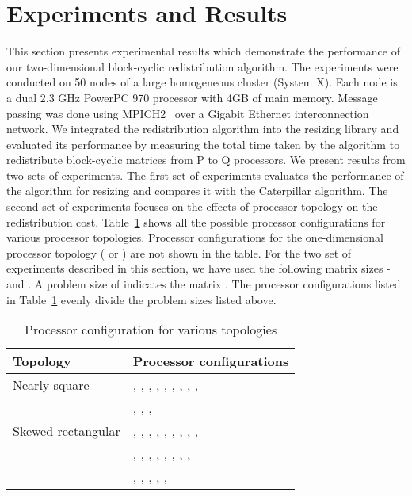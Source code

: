 \documentclass[letterpaper]{llncs}
\begin{document}
\section{Experiments and Results}
\label{sec:experiments}
This section presents experimental results which demonstrate the performance of our two-dimensional block-cyclic redistribution algorithm.
The experiments were conduct\-ed on 50 nodes of a large  homogeneous cluster (System X).  Each node is a dual 2.3 GHz PowerPC 970 processor with 4GB of main memory.
Message passing was done using MPICH2~\cite{mpich2} over a Gigabit Ethernet
interconnection network. We integrated the redistribution algorithm  into the resizing library and evaluated its performance by measuring the total time taken by the algorithm to redistribute block-cyclic matrices  from P to Q processors. 
We present results from two sets of experiments. The first set of experiments evaluates the performance of the algorithm for resizing and compares it with 
the Caterpillar algorithm.
The second set of experiments focuses on the effects of processor topology on the redistribution cost. Table~\ref{tab:procconfig} shows all 
the possible processor configurations for various processor topologies. Processor configurations for the one-dimensional processor topology ( or )  are
not shown in the table. For the two set of experiments described in this section, we have used the following matrix sizes -  and . 
A problem size of  indicates the matrix . 
The processor configurations listed in Table~\ref{tab:procconfig} evenly
divide the problem sizes listed above. 

\begin{table}[ht]
\begin{center}
\caption{Processor configuration for various topologies}
\label{tab:procconfig}
\begin{tabular}{|l|l|}
\hline
Topology&Processor configurations \\
\hline
Nearly-square&, , , , , , , , ,\\
&, , , \\
\hline
Skewed-rectangular &, , , , , , , , ,\\
&, , , , , , , , \\
&, , , , , \\
\hline
\end{tabular}
\end{center}
\end{table}
\end{document}
